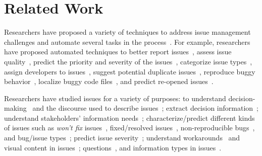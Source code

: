 
\section{Related Work}
\label{sec:related_work}







Researchers have proposed a variety of techniques to address issue management challenges and automate several tasks in the process~\cite{zou2018practitioners,Adnan:msr25}. For example, researchers have proposed automated techniques to better report issues~\cite{song_toward_2022,Fazzini:TSE22,song2023burt}, assess issue quality~\cite{mahmud:icpc2025,chaparro2019assessing,chaparro2017detecting,song2020bee}, 
predict the priority and severity of the issues~\cite{umer2019cnn,tian2015automated}, categorize issue types~\cite{somasundaram2012automatic,catolino2019not}, assign developers to issues~\cite{xia2013accurate,chaitra2022bug}, suggest potential duplicate issues~\cite{Zhou2012a,he2020duplicate,zhang2023duplicate}, reproduce buggy behavior~\cite{Zhao2019,feng2022gifdroid,zhang2023automatically,Zhao2019,zhao2022recdroid+}, localize buggy code files~\cite{akbar2020large,lee2018bench4bl,Ye2016b,ciborowska2022fast,Wong2014,Kochhar2014,florez2021combining,chaparro2019using,chaparro2017using,chaparro2019reformulating,saha2024toward,mahmud2024using,chaparro2016reduction},  and predict re-opened issues~\cite{zimmermann2012characterizing,shihab2010predicting}. 

Researchers have studied issues for a variety of purposes: to understand  decision-making~\cite{hesse2016documented} and 
the discourse used to describe issues~\cite{chaparro2017detecting,chaparro2016vocabulary}; extract decision information~\cite{mahadi2020cross}; understand stakeholders' information needs~\cite{Breu2010}; characterize/predict different kinds of issues such as \textit{won't fix} issues~\cite{panichella2021won}, fixed/resolved issues~\cite{Guo2010}, non-reproducible bugs~\cite{rahman2022works}, and bug/issue types~\cite{Tan2014,catolino2019not,limsettho2016unsupervised}; predict issue severity~\cite{Sureka2010}; understand workarounds~\cite{yan2023programmers} and visual content in issues~\cite{agrawal2022understanding};  
questions~\cite{huang2019empirical}, and information types in issues~\cite{arya2019analysis}.










